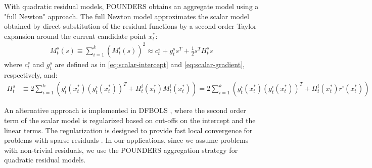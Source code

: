 With quadratic residual models, POUNDERS obtains an aggregate model using a "full Newton" approach. The full Newton model approximates the scalar model obtained by direct substitution of the residual functions by a second order Taylor expansion around the current candidate point $x_t^*$:
\begin{align}
    M^s_t(s)\equiv\sum\limits_{i=1}^k(M_t^i(s))^2\approx c_t^s+g^s_ts^T+\frac{1}{2}s^TH^s_ts
    \label{eq:taylor-exp}
\end{align}
where $c_t^s$ and $g_t^s$ are defined as in \ref{eq:scalar-intercept} and \ref{eq:scalar-gradient}, respectively, and:
\begin{align}
     H_t^s&\equiv2\sum\limits_{i=1}^k(g_t^i(x_t^*)(g_t^i(x_t^*))^T+H_t^i(x_t^*)M_t^i(x_t^*))=2\sum\limits_{i=1}^k(g_t^i(x_t^*)(g_t^i(x_t^*))^T+H_t^i(x_t^*)r^i(x_t^*))\label{eq:scalar-hessian-quadratic}
\end{align}

An alternative approach is implemented in DFBOLS \citep{Zhang2010}, where the second order term of the scalar model is regularized based on cut-offs on the intercept and the linear terms. The regularization is designed to provide fast local convergence for problems with sparse residuals \citep{Zhang2010}. In our applications, since we assume problems with non-trivial residuals, we use the POUNDERS aggregation strategy for quadratic residual models.

